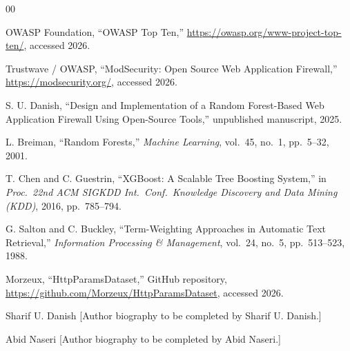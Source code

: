 \documentclass{ieeeaccess}
\begin{document}
\begin{thebibliography}{00}

 OWASP Foundation, ``OWASP Top Ten,'' \url{https://owasp.org/www-project-top-ten/}, accessed 2026.

 Trustwave / OWASP, ``ModSecurity: Open Source Web Application Firewall,'' \url{https://modsecurity.org/}, accessed 2026.

 S. U. Danish, ``Design and Implementation of a Random Forest-Based Web Application Firewall Using Open-Source Tools,'' unpublished manuscript, 2025.

 L. Breiman, ``Random Forests,'' \emph{Machine Learning}, vol.\ 45, no.\ 1, pp.\ 5--32, 2001.

 T. Chen and C. Guestrin, ``XGBoost: A Scalable Tree Boosting System,'' in \emph{Proc.\ 22nd ACM SIGKDD Int.\ Conf.\ Knowledge Discovery and Data Mining (KDD)}, 2016, pp.\ 785--794.

 G. Salton and C. Buckley, ``Term-Weighting Approaches in Automatic Text Retrieval,'' \emph{Information Processing \& Management}, vol.\ 24, no.\ 5, pp.\ 513--523, 1988.

 Morzeux, ``HttpParamsDataset,'' GitHub repository, \url{https://github.com/Morzeux/HttpParamsDataset}, accessed 2026.

\end{thebibliography}

\begin{IEEEbiographynophoto}{Sharif U. Danish}
[Author biography to be completed by Sharif U. Danish.]
\end{IEEEbiographynophoto}

\begin{IEEEbiographynophoto}{Abid Naseri}
[Author biography to be completed by Abid Naseri.]
\end{IEEEbiographynophoto}

\EOD
\end{document}
